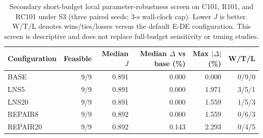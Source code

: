 \begin{table}[H]
\centering
\small
\setlength{\tabcolsep}{4pt}
\renewcommand{\arraystretch}{1.12}
\begin{tabular}{lrrrrr}
\toprule
Configuration & Feasible & Median $J$ & Median $\Delta$ vs base (\%) & Max $|\Delta|$ (\%) & W/T/L \\
\midrule
BASE & 9/9 & 0.891 & 0.000 & 0.000 & 0/9/0 \\
LNS5 & 9/9 & 0.891 & 0.000 & 1.971 & 3/5/1 \\
LNS20 & 9/9 & 0.891 & 0.000 & 1.559 & 1/5/3 \\
REPAIR8 & 9/9 & 0.892 & 0.000 & 1.559 & 0/6/3 \\
REPAIR20 & 9/9 & 0.892 & 0.143 & 2.293 & 0/4/5 \\
\bottomrule
\end{tabular}
\caption{Secondary short-budget local parameter-robustness screen on C101, R101, and RC101 under S3 (three paired seeds; 3-s wall-clock cap). Lower $J$ is better. W/T/L denotes wins/ties/losses versus the default E-DE configuration. This screen is descriptive and does not replace full-budget sensitivity or tuning studies.}
\label{tab:parameter_sensitivity_secondary}
\end{table}

